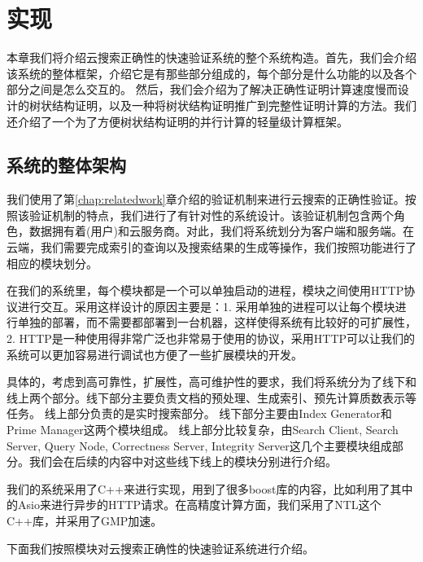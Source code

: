 \chapter{实现}
\label{chap:implementation}

本章我们将介绍云搜索正确性的快速验证系统的整个系统构造。首先，我们会介绍该系统的整体框架，介绍它是有那些部分组成的，每个部分是什么功能的以及各个部分之间是怎么交互的。
然后，我们会介绍为了解决正确性证明计算速度慢而设计的树状结构证明，以及一种将树状结构证明推广到完整性证明计算的方法。我们还介绍了一个为了方便树状结构证明的并行计算的轻量级计算框架。

\section{系统的整体架构}

我们使用了第\ref{chap:relatedwork}章介绍的验证机制来进行云搜索的正确性验证。按照该验证机制的特点，我们进行了有针对性的系统设计。该验证机制包含两个角色，数据拥有着(用户)和云服务商。对此，我们将系统划分为客户端和服务端。在云端，我们需要完成索引的查询以及搜索结果的生成等操作，我们按照功能进行了相应的模块划分。

在我们的系统里，每个模块都是一个可以单独启动的进程，模块之间使用HTTP协议进行交互。采用这样设计的原因主要是：1. 采用单独的进程可以让每个模块进行单独的部署，而不需要都部署到一台机器，这样使得系统有比较好的可扩展性，2. HTTP是一种使用得非常广泛也非常易于使用的协议，采用HTTP可以让我们的系统可以更加容易进行调试也方便了一些扩展模块的开发。

具体的，考虑到高可靠性，扩展性，高可维护性的要求，我们将系统分为了线下和线上两个部分。线下部分主要负责文档的预处理、生成索引、预先计算质数表示等任务。
线上部分负责的是实时搜索部分。
线下部分主要由Index Generator和Prime Manager这两个模块组成。
线上部分比较复杂，由Search Client, Search Server, Query Node, Correctness Server, Integrity Server这几个主要模块组成部分。我们会在后续的内容中对这些线下线上的模块分别进行介绍。

我们的系统采用了C++来进行实现，用到了很多boost库的内容，比如利用了其中的Asio来进行异步的HTTP请求。在高精度计算方面，我们采用了NTL这个C++库，并采用了GMP加速。

下面我们按照模块对云搜索正确性的快速验证系统进行介绍。


